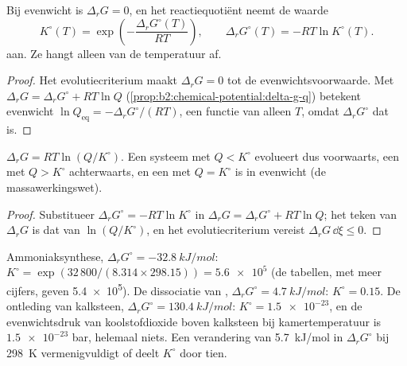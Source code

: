 \begin{theorem}[Standaardevenwichtsconstante]\label{thm:b2:equilibrium-shifts:k-from-g}
Bij evenwicht is $\Delta_r G = 0$, en het reactiequotiënt neemt de waarde
\[
  K^\circ(T) = \exp\!\left(-\frac{\Delta_r G^\circ(T)}{RT}\right), \qquad
  \Delta_r G^\circ(T) = -RT\ln K^\circ(T) .
\]
aan. Ze hangt alleen van de temperatuur af.
\end{theorem}

\begin{proof}
Het evolutiecriterium maakt $\Delta_r G = 0$ tot de evenwichtsvoorwaarde.
Met $\Delta_r G = \Delta_r G^\circ + RT\ln Q$
(\cref{prop:b2:chemical-potential:delta-g-q}) betekent evenwicht $\ln Q_{\text{eq}}
= -\Delta_r G^\circ/(RT)$, een functie van alleen $T$, omdat $\Delta_r G^\circ$ dat is.
\end{proof}

\begin{corollary}\label{cor:b2:equilibrium-shifts:mass-action}
$\Delta_r G = RT\ln(Q/K^\circ)$. Een systeem met $Q < K^\circ$ evolueert dus
voorwaarts, een met $Q > K^\circ$ achterwaarts, en een met $Q = K^\circ$ is in
evenwicht (de massawerkingswet).
\end{corollary}

\begin{proof}
Substitueer $\Delta_r G^\circ = -RT\ln K^\circ$ in $\Delta_r G = \Delta_r G^\circ
+ RT\ln Q$; het teken van $\Delta_r G$ is dat van $\ln(Q/K^\circ)$, en het
evolutiecriterium vereist $\Delta_r G\,\dd\xi \leq 0$.
\end{proof}

\begin{example}\label{ex:b2:equilibrium-shifts:constants}
Ammoniaksynthese, $\Delta_r G^\circ = \qty{-32.8}{kJ/mol}$: $K^\circ =
\exp(32\,800/(8.314 \times 298.15)) = \num{5.6e5}$ (de tabellen, met meer
cijfers, geven \num{5.4e5}). De dissociatie van , $\Delta_r G^\circ =
\qty{+4.7}{kJ/mol}$: $K^\circ = 0.15$. De ontleding van kalksteen,
$\Delta_r G^\circ = \qty{+130.4}{kJ/mol}$: $K^\circ = \num{1.5e-23}$, en de
evenwichtsdruk van koolstofdioxide boven kalksteen bij kamertemperatuur
is $\num{1.5e-23}$ bar, helemaal niets. Een verandering van \qty{5.7}{kJ/mol} in
$\Delta_r G^\circ$ bij \qty{298}{K} vermenigvuldigt of deelt $K^\circ$ door tien.
\end{example}

